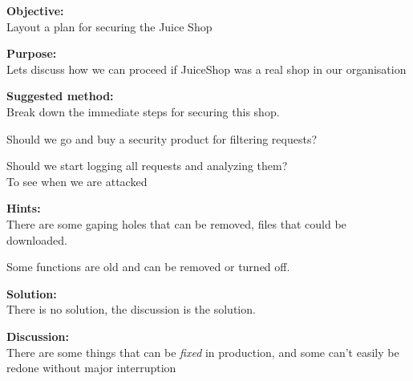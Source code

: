 \documentclass[a4paper,11pt,notitlepage]{report}
\begin{document}
{\bf Objective:}\\
Layout a plan for securing the Juice Shop

{\bf Purpose:}\\
Lets discuss how we can proceed if JuiceShop was a real shop in our organisation

{\bf Suggested method:}\\
Break down the immediate steps for securing this shop.

Should we go and buy a security product for filtering requests?

Should we start logging all requests and analyzing them?\\
To see when we are attacked

{\bf Hints:}\\
There are some gaping holes that can be removed, files that could be downloaded.

Some functions are old and can be removed or turned off.

{\bf Solution:}\\
There is no solution, the discussion is the solution.

{\bf Discussion:}\\
There are some things that can be \emph{fixed} in production, and some can't easily be redone without major interruption
\end{document}
